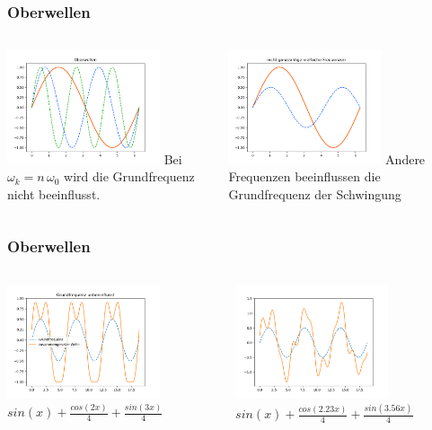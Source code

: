 \begin{frame}
	\frametitle{Oberwellen}
	\begin{columns}
		\begin{column}{0.5\linewidth}
			\centering
			\includegraphics[width=170px]{images/00-oberwellen-0.png}
			Bei $\omega_k = n\,\omega_0$ wird die Grundfrequenz nicht beeinflusst.
		\end{column}
		\begin{column}{0.5\linewidth}
			\centering
			\includegraphics[width=170px]{images/00-oberwellen-1.png}
			Andere Frequenzen beeinflussen die Grundfrequenz der Schwingung
		\end{column}
	\end{columns}
\end{frame}

\begin{frame}
	\frametitle{Oberwellen}
	\begin{columns}
		\begin{column}{0.5\linewidth}
			\centering
			\includegraphics[width=170px]{images/00-oberwellen-zus-0.png}
			$sin(x) + \frac{cos(2x)}{4}+\frac{sin(3x)}{4}$
		\end{column}
		\begin{column}{0.5\linewidth}
			\centering
			\includegraphics[width=170px]{images/00-oberwellen-zus-1.png}
			$sin(x) + \frac{cos(2.23x)}{4}+\frac{sin(3.56x)}{4}$
		\end{column}
	\end{columns}
\end{frame}

